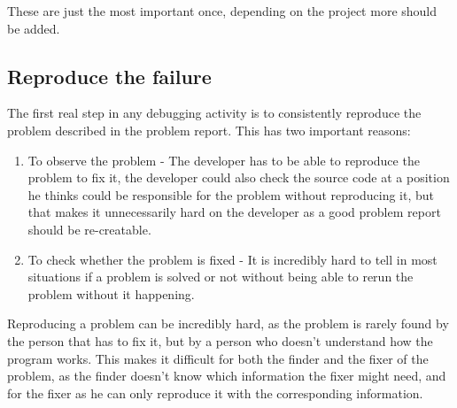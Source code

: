 These are just the most important once, depending on the project more should be added.

\subsection{Reproduce the failure}
\label{aodZellerReproduce}
The first real step in any debugging activity is to consistently reproduce the problem described in the problem report. This has two important reasons:

\begin{enumerate}
  \item To observe the problem - The developer has to be able to reproduce the problem to fix it, the developer could also check the source code at a position he thinks could be responsible for the problem without reproducing it, but that makes it unnecessarily hard on the developer as a good problem report should be re-creatable.
  \item To check whether the problem is fixed - It is incredibly hard to tell in most situations if a problem is solved or not without being able to rerun the problem without it happening.
\end{enumerate}

Reproducing a problem can be incredibly hard, as the problem is rarely found by the person that has to fix it, but by a person who doesn't understand how the program works. This makes it difficult for both the finder and the fixer of the problem, as the finder doesn't know which information the fixer might need, and for the fixer as he can only reproduce it with the corresponding information.

